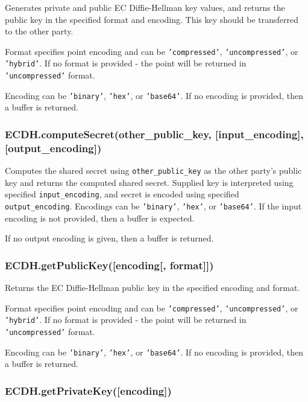Generates private and public EC Diffie-Hellman key values, and returns
the public key in the specified format and encoding. This key should be
transferred to the other party.

Format specifies point encoding and can be \texttt{'compressed'},
\texttt{'uncompressed'}, or \texttt{'hybrid'}. If no format is provided
- the point will be returned in \texttt{'uncompressed'} format.

Encoding can be \texttt{'binary'}, \texttt{'hex'}, or \texttt{'base64'}.
If no encoding is provided, then a buffer is returned.

\subsubsection{ECDH.computeSecret(other\_public\_key,
{[}input\_encoding{]},
{[}output\_encoding{]})}\label{ecdh.computesecretotherux5fpublicux5fkey-inputux5fencoding-outputux5fencoding}

Computes the shared secret using \texttt{other\_public\_key} as the
other party's public key and returns the computed shared secret.
Supplied key is interpreted using specified \texttt{input\_encoding},
and secret is encoded using specified \texttt{output\_encoding}.
Encodings can be \texttt{'binary'}, \texttt{'hex'}, or
\texttt{'base64'}. If the input encoding is not provided, then a buffer
is expected.

If no output encoding is given, then a buffer is returned.

\subsubsection{ECDH.getPublicKey({[}encoding{[},
format{]}{]})}\label{ecdh.getpublickeyencoding-format}

Returns the EC Diffie-Hellman public key in the specified encoding and
format.

Format specifies point encoding and can be \texttt{'compressed'},
\texttt{'uncompressed'}, or \texttt{'hybrid'}. If no format is provided
- the point will be returned in \texttt{'uncompressed'} format.

Encoding can be \texttt{'binary'}, \texttt{'hex'}, or \texttt{'base64'}.
If no encoding is provided, then a buffer is returned.

\subsubsection{ECDH.getPrivateKey({[}encoding{]})}\label{ecdh.getprivatekeyencoding}

